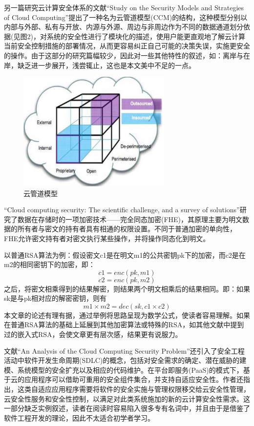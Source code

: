 \documentclass[a4paper, 12pt, conference]{ieeeconf}      %
\begin{document}
另一篇研究云计算安全体系的文献“Study on the Security Models and Strategies of Cloud Computing”提出了一种名为云管道模型(CCM)的结构，这种模型分别以内部与外部、私有与开放、内源与外源、周边与非周边作为不同的数据通道划分依据(见图2)，对系统的安全性进行了模块化的描述，使用户能更直观地了解云计算当前安全控制措施的部署情况，从而更容易纠正自己可能的决策失误，实施更安全的操作\cite{che2011study}。由于这部分的研究篇幅较少，因此对一些其他特性的叙述，如：离岸与在岸，缺乏进一步展开，浅尝辄止，这也是本文美中不足的一点。

\begin{figure}[htbp]
	\centering
	\includegraphics[width=3in]{pic/图2}
	\caption{云管道模型}
	\label{fig:2}
\end{figure}

“Cloud computing security: The scientific challenge, and a survey of solutions”研究了数据在存储时的一项加密技术——完全同态加密(FHE)，其原理主要为明文数据的所有者与密文的持有者具有相通的权限设置。不同于普通加密的单向性，FHE允许密文持有者对密文执行某些操作，并将操作同态化到明文\cite{ryan2013cloud}。

以普通RSA算法为例：假设密文c1是在明文m1的公共密钥pk下的加密，而c2是在m2的相同密钥下的加密，即：$$c1 = enc(pk,m1)$$ $$c2 = enc(pk,m2)$$之后，将密文相乘得到的结果解密，则结果两个明文相乘后的结果相同。即：如果sk是与pk相对应的解密密钥，则有$$m1 \times m2 = dec(sk,c1 \times c2)$$本文章的论述有理有据，通过举例将思路呈现为数学公式，使读者容易理解。如果在普通RSA算法的基础上延展到其他加密算法或特殊的RSA，如其他文献中提到过的嵌入式RSA，会使文章更有层次感，结果更有说服力。



文献“An Analysis of the Cloud Computing Security Problem”还引入了安全工程活动中软件开发生命周期(SDLC)的概念，包括对安全需求的确定、潜在威胁的建模、系统模型的安全扩充以及相应的代码维护。在平台即服务(PaaS)的模式下，基于云的应用程序可以借助可重用的安全组件集合，并支持自适应安全性\cite{almorsy2016analysis}。作者还指出，这类自适应应用程序需要将软件的安全实施与管理权限移交给云安全性管理，云安全性服务和安全性控制，以满足对此类系统施加的新的云计算安全性需求。这一部分缺乏实例叙述，读者在阅读时容易陷入很多专有名词中，并且由于是借鉴了软件工程开发的理论，因此不太适合初学者学习。
\end{document}
